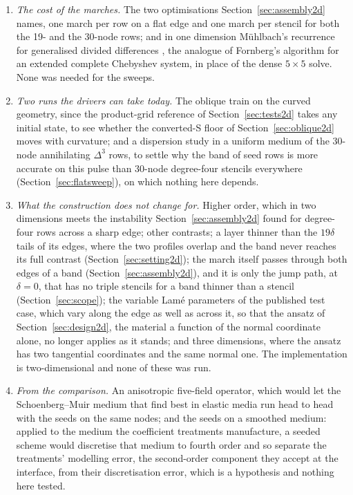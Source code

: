 \documentclass[11pt]{amsart}
\theoremstyle{definition}
\theoremstyle{remark}
\begin{document}
\begin{enumerate}
  seeds exist to remove, so we expect a stable operator with more
  damping, not less, that damps the resolved physics at the edge, and
  would build it only if the spectrum or the errors ever called for it.
\item \emph{The cost of the marches.} The two optimisations Section~\ref{sec:assembly2d}
  names, one march per row on a flat edge and one march per stencil
  for both the 19- and the 30-node rows; and in one dimension
  M\"uhlbach's recurrence for generalised divided differences
  \cite{Muhlbach1973,Gerolymos2012}, the analogue of Fornberg's algorithm for an
  extended complete Chebyshev system, in place of the dense $5 \times 5$
  solve. None was needed for the sweeps.
\item \emph{Two runs the drivers can take today.} The oblique train on
  the curved geometry, since the product-grid reference of
  Section~\ref{sec:tests2d} takes any initial state, to see whether the
  converted-S floor of Section~\ref{sec:oblique2d} moves with
  curvature; and a dispersion study in a uniform medium of the
  $30$-node annihilating $\Delta^3$ rows, to settle why the band of
  seed rows is more accurate on this pulse than $30$-node degree-four
  stencils everywhere (Section~\ref{sec:flatsweep}), on which nothing
  here depends.
\item \emph{What the construction does not change for.} Higher order,
  which in two dimensions meets the instability
  Section~\ref{sec:assembly2d} found for degree-four rows across a
  sharp edge; other contrasts; a layer thinner than the $19\delta$ tails of
  its edges, where the two profiles overlap and the band never reaches
  its full contrast (Section~\ref{sec:setting2d}); the march itself
  passes through both edges of a band (Section~\ref{sec:assembly2d}),
  and it is only the jump path, at $\delta = 0$, that has no triple
  stencils for a band thinner than a stencil (Section~\ref{sec:scope}); the
  variable Lam\'e parameters of the published test case, which vary
  along the edge as well as across it, so that the ansatz of
  Section~\ref{sec:design2d}, the material a function of the normal
  coordinate alone, no longer applies as it stands; and three
  dimensions, where the ansatz has two tangential coordinates and the
  same normal one. The implementation is two-dimensional and none of
  these was run.
\item \emph{From the comparison.} An anisotropic five-field operator,
  which would let the Schoenberg--Muir medium that
  \cite{KoeneWittstenRobertsson2022} find best in elastic media run
  head to head with the seeds on the same nodes; and the seeds on a
  smoothed medium: applied to the medium the coefficient treatments
  manufacture, a seeded scheme would discretise that medium to fourth
  order and so separate the treatments' modelling error, the
  second-order component they accept at the interface, from their
  discretisation error, which is a hypothesis and nothing here tested.
\end{enumerate}
\end{document}
